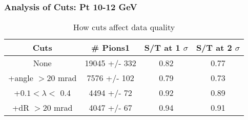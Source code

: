 \frame
{
\frametitle{Analysis of Cuts: Pt 10-12 GeV}
\begin{table}
\caption{How cuts affect data quality}
\centering
\begin{tabular}{c c c c}
\hline\hline
Cuts & \# Pions1 & S/T at 1 $\sigma$ & S/T at 2 $\sigma$ \\ [0.5ex]
\hline
None & 19045 +/-  332 & 0.82 & 0.77 \\ %
+angle $> 20$ mrad & 7576 +/-  102 & 0.79 & 0.73 \\ %
+$0.1 < \lambda <$ 0.4 & 4494 +/-   72 & 0.92 & 0.89 \\ %
+dR $> 20$ mrad & 4047 +/-   67 & 0.94 & 0.91 \\ %
[1ex]
\hline
\end{tabular}
\label{table:nonlin}
\end{table}
}
